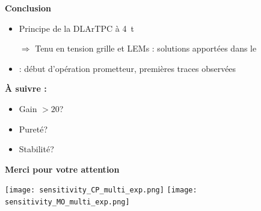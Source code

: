     {
        \begin{specialframe}
            \hspace*{-1.8cm}\parbox[t]{\textwidth}{
                        \centering \begin{Huge}
                        \vspace{2cm}
                        \textbf{Conclusion}
                        \vspace{1cm}
                        \end{Huge}
                        \begin{itemize}
                            \item Principe de la DLArTPC \textcolor{green}{\checkmark} à \SI{4}{\tonne}
                            \item[$\Rightarrow$] Tenu en tension grille et LEMs : solutions apportées dans le \SSS{}
                            \item \SSS{} : début d'opération prometteur, premières traces observées
                        \end{itemize}
                        \vspace{0.3cm}
                        \textbf{À suivre :}
                        \begin{itemize}
                            \item Gain $> 20$?
                            \item Pureté?
                            \item Stabilité?
                        \end{itemize}
                    }
        \end{specialframe}
    }
    {
        \begin{specialframe}
            \hspace*{-1.8cm}\parbox[t]{\textwidth}{
                        \centering \begin{Huge}
                        \vspace{1cm}
                        \textbf{Merci pour votre attention}
                        \end{Huge}
                    }
        \end{specialframe}
    }
    
    {
            \begin{specialframe}
                \flushleft\hspace{-2cm}\texttt{[image: sensitivity\_CP\_multi\_exp.png]}
                \texttt{[image: sensitivity\_MO\_multi\_exp.png]}
            \end{specialframe}
        }
    


